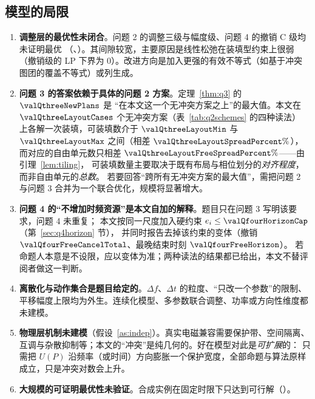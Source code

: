 \subsection{模型的局限}
\label{sec:limits}

\begin{enumerate}[leftmargin=1.8em,itemsep=0.25em]
  \item \textbf{调整层的最优性未闭合}。问题 2 的调整三级与幅度级、问题 4 的撤销 C 级均未证明最优
        （\valQtwoAllOptimal{}、\valQfourAllOptimal{}）。其间隙较宽，主要原因是线性松弛在装填型约束上很弱
        （撤销级的 LP 下界为 $0$）。改进方向是加入更强的有效不等式（如基于冲突图团的覆盖不等式）或列生成。
  \item \textbf{问题 3 的答案依赖于具体的问题 2 方案}。定理~\ref{thm:q3} 的 $\valQthreeNewPlans$ 是
        “在本文这一个无冲突方案之上”的最大值。本文在 $\valQthreeLayoutCases$ 个无冲突方案（表~\ref{tab:q2schemes} 的四种读法）
        上各解一次装填，可装填数介于 $\valQthreeLayoutMin$ 与 $\valQthreeLayoutMax$ 之间（相差 $\valQthreeLayoutSpreadPercent\%$），
        而对应的自由单元数只相差 $\valQthreeLayoutFreeSpreadPercent\%$——由引理~\ref{lem:tiling}，
        可装填数量主要取决于既有布局与相位划分的\emph{对齐程度}，而非自由单元的\emph{总数}。
        若要回答“跨所有无冲突方案的最大值”，需把问题 2 与问题 3 合并为一个联合优化，规模将显著增大。
  \item \textbf{问题 4 的“不增加时频资源”是本文自加的解释}。题目只在问题 3 写明该要求，问题 4 未重复；
        本文按同一尺度加入硬约束 $e_i\le\valQfourHorizonCap$（第~\ref{sec:q4horizon} 节），
        并同时报告去掉该约束的变体（撤销 $\valQfourFreeCancelTotal$、最晚结束时刻 $\valQfourFreeHorizon$）。
        若命题人本意是不设限，应以变体为准；两种读法的结果都已给出，本文不替评阅者做这一判断。
  \item \textbf{离散化与动作集合是题目给定的}。$\Delta f$、$\Delta t$ 的粒度、“只改一个参数”的限制、
        平移幅度上限均为外生。连续化模型、多参数联合调整、功率或方向性维度都未建模。
  \item \textbf{物理层机制未建模}（假设~\ref{as:indep}）。真实电磁兼容需要保护带、空间隔离、
        互调与杂散抑制等；本文的“冲突”是纯几何的。好在模型对此是\emph{可扩展}的：
        只需把 $U(P)$ 沿频率（或时间）方向膨胀一个保护宽度，全部命题与算法原样成立，只是冲突对数会上升。
  \item \textbf{大规模的可证明最优性未验证}。合成实例在固定时限下只达到可行解（\valBenchScaleAllOptimal{}）。
\end{enumerate}

